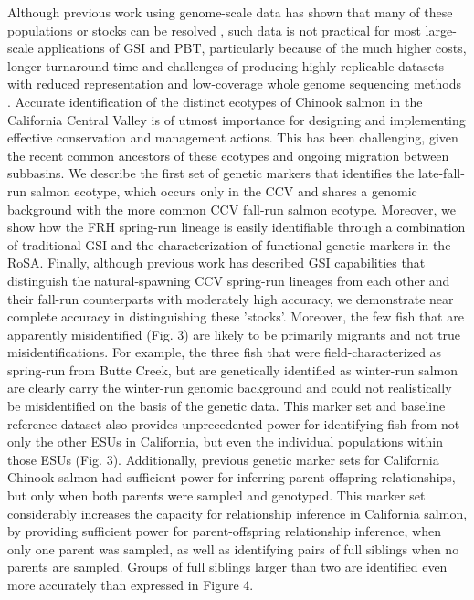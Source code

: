 Although previous work using genome-scale data has shown that many of these populations or stocks can be resolved \cite{thompson2020complex,meek2020identifying},
such data is not practical for most large-scale applications of GSI and PBT, particularly because
of the much higher costs, longer turnaround time and challenges of producing highly
replicable datasets with reduced representation and low-coverage whole genome sequencing methods \cite{ali2016rad}. 
Accurate identification of the distinct ecotypes of Chinook salmon in the California Central Valley is of utmost importance for designing and implementing effective conservation and management actions. This has been challenging, given the recent common ancestors of these ecotypes and ongoing migration between subbasins. We describe the first set of genetic markers that identifies the late-fall-run salmon ecotype, which occurs only in the CCV and shares a genomic background with the more common CCV fall-run salmon ecotype. Moreover, we show how the FRH spring-run lineage is easily identifiable through a combination of traditional GSI and the characterization of functional genetic markers in the RoSA. Finally, although previous work has described GSI capabilities that distinguish the natural-spawning CCV spring-run lineages from each other and their fall-run counterparts with moderately high accuracy, we demonstrate near complete accuracy in distinguishing these 'stocks'. Moreover, the few fish that are apparently misidentified (Fig. 3) are likely to be primarily migrants and not true misidentifications. For example, the three fish that were field-characterized as spring-run from Butte Creek, but are genetically identified as winter-run salmon are clearly carry the winter-run genomic background and could not realistically be misidentified on the basis of the genetic data. This marker set and baseline reference dataset also provides unprecedented power for identifying fish from not only the other ESUs in California, but even the individual populations within those ESUs (Fig. 3).
Additionally, previous genetic marker sets for California Chinook salmon had sufficient power for inferring parent-offspring relationships, but only when both parents were sampled and genotyped. This marker set considerably increases the capacity for relationship inference in California salmon, by providing sufficient power for parent-offspring relationship inference, when only one parent was sampled, as well as identifying pairs of full siblings when no parents are sampled. Groups of full siblings larger than two are identified even more accurately than expressed in Figure 4. 

